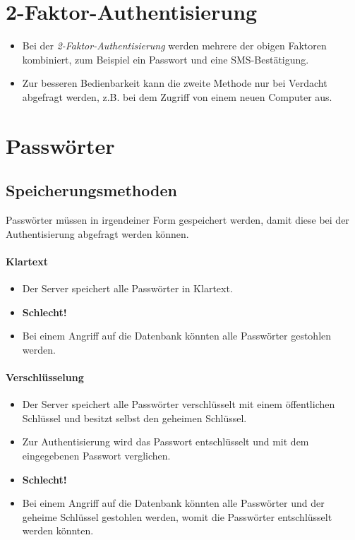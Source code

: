     \section{2-Faktor-Authentisierung}
        \begin{itemize}
        	\item Bei der \textit{2-Faktor-Authentisierung} werden mehrere der obigen Faktoren kombiniert, zum Beispiel ein Passwort und eine SMS-Bestätigung.
        	\item Zur besseren Bedienbarkeit kann die zweite Methode nur bei Verdacht abgefragt werden, z.B. bei dem Zugriff von einem neuen Computer aus.
        \end{itemize}

    \section{Passwörter}
        \subsection{Speicherungsmethoden}
            Passwörter müssen in irgendeiner Form gespeichert werden, damit diese bei der Authentisierung abgefragt werden können.
        
            \paragraph{Klartext}
                \begin{itemize}
                    \item Der Server speichert alle Passwörter in Klartext.
                    \item \textbf{Schlecht!}
                	\item Bei einem Angriff auf die Datenbank könnten alle Passwörter gestohlen werden.
                \end{itemize}

            \paragraph{Verschlüsselung}
                \begin{itemize}
                	\item Der Server speichert alle Passwörter verschlüsselt mit einem öffentlichen Schlüssel und besitzt selbst den geheimen Schlüssel.
                	\item Zur Authentisierung wird das Passwort entschlüsselt und mit dem eingegebenen Passwort verglichen.
                	\item \textbf{Schlecht!}
                	\item Bei einem Angriff auf die Datenbank könnten alle Passwörter und der geheime Schlüssel gestohlen werden, womit die Passwörter entschlüsselt werden könnten.
                \end{itemize}

